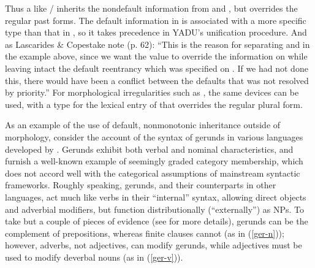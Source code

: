 \documentclass[output=paper
	        ,collection
	        ,collectionchapter
 	        ,biblatex
                ,babelshorthands
                ,newtxmath
                ,draftmode
                ,colorlinks, citecolor=brown
]{langscibook}
\begin{document}
Thus a  like / inherits the nondefault information from  and , but overrides the regular past forms.
The default information in  is associated with a more specific type than that in , so it takes precedence in YADU's unification procedure.
And as Lascarides \& Copestake note (p. 62): ``This is the reason for separating  and  in the example above, since we want the  value to override the  information on  while leaving intact the default reentrancy which was specified on .  If we had not done this, there would have been a conflict between the defaults that was not resolved by priority.'' For morphological irregularities such as , the same devices can be used, with a type for the lexical entry of  that overrides the regular plural form.

As an example of the use of default, nonmonotonic inheritance outside of morphology, consider the account of the syntax of gerunds in various languages developed by \citet{Malouf2000a}. 
Gerunds exhibit both verbal and nominal characteristics, and furnish a well-known example of seemingly graded category membership, which does not accord well with the categorical assumptions of mainstream syntactic frameworks.
Roughly speaking,  gerunds, and their counterparts in other languages, act much like verbs in their ``internal'' syntax, allowing direct objects and adverbial modifiers, but function distributionally (``externally'') as NPs.
To take but a couple of pieces of evidence (see \citealt[27--33]{Malouf2000a} for more details), 
gerunds can be the complement of prepositions, whereas finite clauses cannot (as in (\ref{ger-n})); however, adverbs, not adjectives, can modify gerunds, while adjectives must be used to modify deverbal nouns (as in (\ref{ger-v})).


\eal
\label{ger-n}
\zl
\eal
\label{ger-v}
\zl
\end{document}

